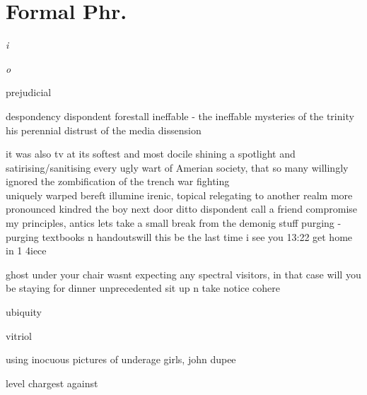 \newpage

\section*{Formal Phr.}

\begin{multicols}{2}

\lettrine{\textit{i}}{} \\


\lettrine{\textit{o}}{} \\


\end{multicols}


prejudicial



despondency
dispondent
forestall
ineffable - the ineffable mysteries of the trinity
his perennial distrust of the media
dissension

it was also tv at its softest and most docile
shining a spotlight and satirising/sanitising every ugly wart of Amerian society, that so many willingly ignored
the zombification of the
trench war fighting\\
uniquely warped
bereft illumine irenic, topical relegating to another realm
more pronounced
kindred
the boy next door
ditto
dispondent
call a friend
compromise my principles, antics
lets take a small break from the demonig stuff
purging - purging textbooks n handoutswill this be the last time i see you
13:22
get home in 1 4iece


ghost under your chair
wasnt expecting any spectral visitors, in that case will you be staying for dinner
unprecedented
sit up n take notice
cohere



ubiquity

vitriol

using inocuous pictures of underage girls, john dupee

level chargest against

